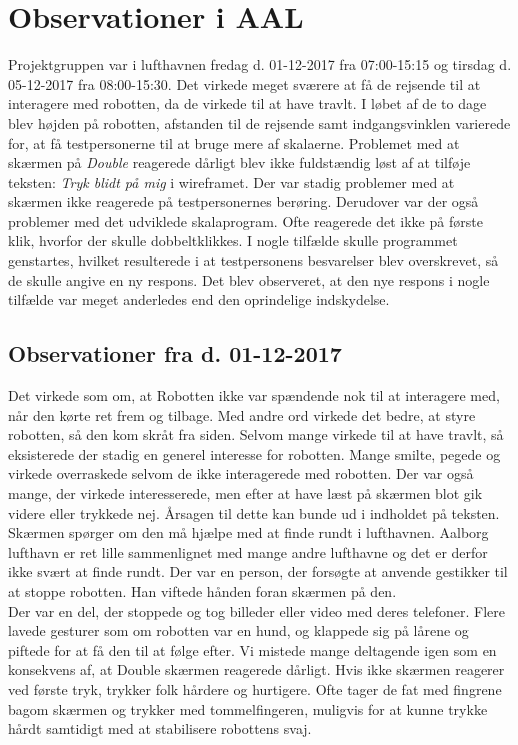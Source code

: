 \section{Observationer i AAL}
\label{TestAfSkalaLufthavnsBesog}
%
Projektgruppen var i lufthavnen fredag d. 01-12-2017 fra 07:00-15:15 og tirsdag d. 05-12-2017 fra 08:00-15:30. Det virkede meget sværere at få de rejsende til at interagere med robotten, da de virkede til at have travlt. I løbet af de to dage blev højden på robotten, afstanden til de rejsende samt indgangsvinklen varierede for, at få testpersonerne til at bruge mere af skalaerne.\blankline
%
Problemet med at skærmen på \textit{Double} reagerede dårligt blev ikke fuldstændig løst af at tilføje teksten: \textit{Tryk blidt på mig} i wireframet. Der var stadig problemer med at skærmen ikke reagerede på testpersonernes berøring. Derudover var der også problemer med det udviklede skalaprogram. Ofte reagerede det ikke på første klik, hvorfor der skulle dobbeltklikkes. I nogle tilfælde skulle programmet genstartes, hvilket resulterede i at testpersonens besvarelser blev overskrevet, så de skulle angive en ny respons. Det blev observeret, at den nye respons i nogle tilfælde var meget anderledes end den oprindelige indskydelse.

\subsection{Observationer fra d. 01-12-2017}
Det virkede som om, at Robotten ikke var spændende nok til at interagere med, når den kørte ret frem og tilbage. Med andre ord virkede det bedre, at styre robotten, så den kom skråt fra siden.
Selvom mange virkede til at have travlt, så eksisterede der stadig en generel interesse for robotten. Mange smilte, pegede og virkede overraskede selvom de ikke interagerede med robotten. Der var også mange, der virkede interesserede, men efter at have læst på skærmen blot gik videre eller trykkede nej. Årsagen til dette kan bunde ud i indholdet på teksten. Skærmen spørger om den må hjælpe med at finde rundt i lufthavnen. Aalborg lufthavn er ret lille sammenlignet med mange andre lufthavne og det er derfor ikke svært at finde rundt. Der var en person, der forsøgte at anvende gestikker til at stoppe robotten. Han viftede hånden foran skærmen på den.\\
Der var en del, der stoppede og tog billeder eller video med deres telefoner. Flere lavede gesturer som om robotten var en hund, og klappede sig på lårene og piftede for at få den til at følge efter. Vi mistede mange deltagende igen som en konsekvens af, at Double skærmen reagerede dårligt. Hvis ikke skærmen reagerer ved første tryk, trykker folk hårdere og hurtigere. Ofte tager de fat med fingrene bagom skærmen og trykker med tommelfingeren, muligvis for at kunne trykke hårdt samtidigt med at stabilisere robottens svaj.

